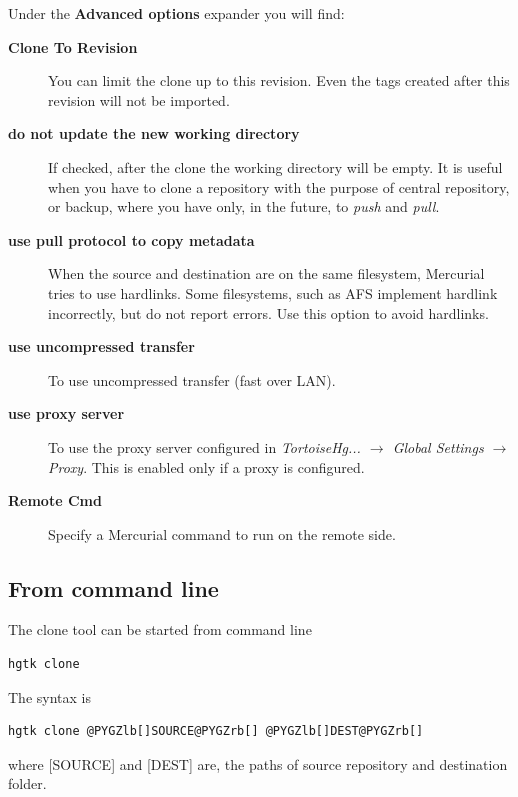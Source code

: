 \documentclass[letterpaper,10pt,english]{manual}
\begin{document}
Under the \textbf{Advanced options} expander you will find:
\begin{description}
\item[\textbf{Clone To Revision}]
You can limit the clone up to this revision. Even the tags created
after this revision will not be imported.

\item[\textbf{do not update the new working directory}]
If checked, after the clone the working directory will be empty. It
is useful when you have to clone a repository with the purpose of
central repository, or backup, where you have only, in the future,
to \emph{push} and \emph{pull}.

\item[\textbf{use pull protocol to copy metadata}]
When the source and destination are on the same filesystem,
Mercurial tries to use hardlinks. Some filesystems, such as AFS
implement hardlink incorrectly, but do not report errors. Use this
option to avoid hardlinks.

\item[\textbf{use uncompressed transfer}]
To use uncompressed transfer (fast over LAN).

\item[\textbf{use proxy server}]
To use the proxy server configured in \emph{TortoiseHg... \(\rightarrow\) Global Settings \(\rightarrow\) Proxy}.
This is enabled only if a proxy is configured.

\item[\textbf{Remote Cmd}]
Specify a Mercurial command to run  on the remote side.

\end{description}


\subsection{From command line}

The clone tool can be started from command line

\begin{Verbatim}[commandchars=@\[\]]
hgtk clone
\end{Verbatim}

The syntax is

\begin{Verbatim}[commandchars=@\[\]]
hgtk clone @PYGZlb[]SOURCE@PYGZrb[] @PYGZlb[]DEST@PYGZrb[]
\end{Verbatim}

where {[}SOURCE{]} and {[}DEST{]} are, the paths of source repository and destination folder.
\end{document}

